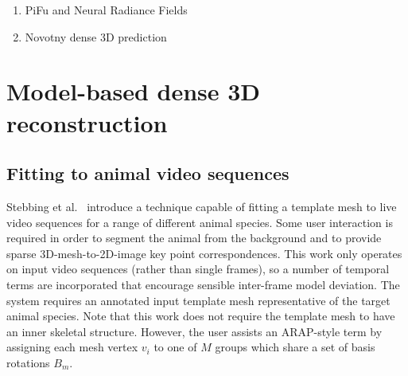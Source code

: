 \begin{enumerate}
    \item PiFu and Neural Radiance Fields
    \item Novotny dense 3D prediction
\end{enumerate}

\section{Model-based dense 3D reconstruction}

\subsection{Fitting to animal video sequences}
Stebbing et al.~\cite{arap_stebbing} introduce a technique capable of fitting a template mesh to live video sequences for a range of different animal species. Some user interaction is required in order to segment the animal from the background and to provide sparse 3D-mesh-to-2D-image key point correspondences. This work only operates on input video sequences (rather than single frames), so a number of temporal terms are incorporated that encourage sensible inter-frame model deviation. The system requires an annotated input template mesh representative of the target animal species. Note that this work does not require the template mesh to have an inner skeletal structure. However, the user assists an ARAP-style term by assigning each mesh vertex $v_i$ to one of $M$ groups which share a set of basis rotations $B_{m}$. 

